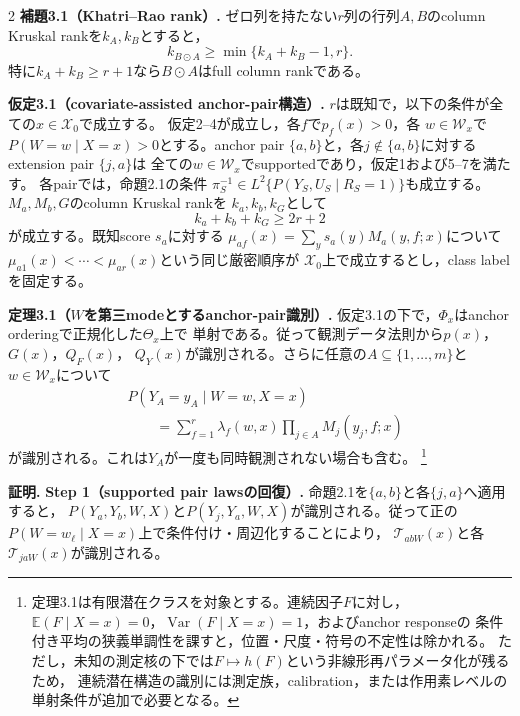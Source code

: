 \documentclass[a4paper,10pt]{article}
\newcommand{\E}{\mathbb E}
\begin{document}
\begin{multicols}{2}
\noindent\textbf{補題3.1（Khatri--Rao rank）.}
ゼロ列を持たない$r$列の行列$A,B$のcolumn Kruskal rankを$k_A,k_B$とすると，
\begin{equation}
k_{B\odot A}\ge\min\{k_A+k_B-1,r\}.
\label{eq:khatri-rao-rank-bound}
\end{equation}
特に$k_A+k_B\ge r+1$なら$B\odot A$はfull column rankである。

\noindent\textbf{仮定3.1（covariate-assisted anchor-pair構造）.}
$r$は既知で，以下の条件が全ての$x\in\mathcal X_0$で成立する。
仮定2--4が成立し，各$f$で$p_f(x)>0$，各
$w\in\mathcal W_x$で$P(W=w\mid X=x)>0$とする。anchor pair
$\{a,b\}$と，各$j\notin\{a,b\}$に対するextension pair $\{j,a\}$は
全ての$w\in\mathcal W_x$でsupportedであり，仮定1および5--7を満たす。
各pairでは，命題2.1の条件
$\pi_S^{-1}\in L^2\{P(Y_S,U_S\mid R_S=1)\}$も成立する。
$M_a,M_b,G$のcolumn Kruskal rankを
$k_a,k_b,k_G$として
\begin{equation}
k_a+k_b+k_G\ge2r+2
\label{eq:anchor-kruskal-condition}
\end{equation}
が成立する。既知score $s_a$に対する
$\mu_{af}(x)=\sum_y s_a(y)M_a(y,f;x)$について
$\mu_{a1}(x)<\cdots<\mu_{ar}(x)$という同じ厳密順序が
$\mathcal X_0$上で成立するとし，class labelを固定する。

\noindent\textbf{定理3.1（$W$を第三modeとするanchor-pair識別）.}
仮定3.1の下で，$\Phi_x$はanchor orderingで正規化した$\Theta_x$上で
単射である。従って観測データ法則から$p(x)$，$G(x)$，$Q_F(x)$，
$Q_Y(x)$が識別される。さらに任意の$A\subseteq\{1,\ldots,m\}$と
$w\in\mathcal W_x$について
\begin{equation}
\begin{aligned}
&P(Y_A=y_A\mid W=w,X=x)\\
&\qquad=\sum_{f=1}^r\lambda_f(w,x)
 \prod_{j\in A}M_j(y_j,f;x)
\end{aligned}
\label{eq:latent-fulljoint-pair}
\end{equation}
が識別される。これは$Y_A$が一度も同時観測されない場合も含む。%
\footnote{定理3.1は有限潜在クラスを対象とする。連続因子$F$に対し，
$\E(F\mid X=x)=0$，$\operatorname{Var}(F\mid X=x)=1$，およびanchor responseの
条件付き平均の狭義単調性を課すと，位置・尺度・符号の不定性は除かれる。
ただし，未知の測定核の下では$F\mapsto h(F)$という非線形再パラメータ化が残るため，
連続潜在構造の識別には測定族，calibration，または作用素レベルの単射条件が追加で必要となる。}

\noindent\textbf{証明.}
\noindent\textbf{Step 1（supported pair lawsの回復）.}
命題2.1を$\{a,b\}$と各$\{j,a\}$へ適用すると，
$P(Y_a,Y_b,W,X)$と$P(Y_j,Y_a,W,X)$が識別される。従って正の
$P(W=w_\ell\mid X=x)$上で条件付け・周辺化することにより，
$\mathcal T_{abW}(x)$と各$\mathcal T_{jaW}(x)$が識別される。


\end{multicols}
\end{document}
